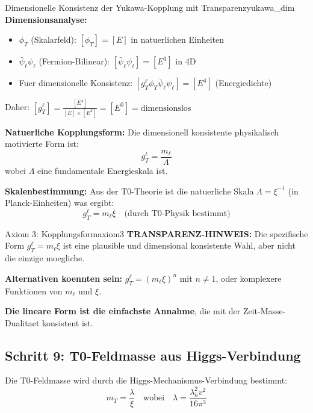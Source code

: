 \documentclass[12pt,a4paper]{article}
\begin{document}
	\begin{important}{Dimensionelle Konsistenz der Yukawa-Kopplung mit Transparenz}{yukawa_dim}
		\textbf{Dimensionsanalyse:}
		\begin{itemize}
			\item $\phi_T$ (Skalarfeld): $[\phi_T] = [E]$ in natuerlichen Einheiten
			\item $\bar{\psi}_\ell \psi_\ell$ (Fermion-Bilinear): $[\bar{\psi}_\ell \psi_\ell] = [E^3]$ in 4D
			\item Fuer dimensionelle Konsistenz: $[g_T^\ell \phi_T \bar{\psi}_\ell \psi_\ell] = [E^4]$ (Energiedichte)
		\end{itemize}
		
		Daher: $[g_T^\ell] = \frac{[E^4]}{[E] \times [E^3]} = [E^0] = \text{dimensionslos}$
		
		\textbf{Natuerliche Kopplungsform:}
		Die dimensionell konsistente physikalisch motivierte Form ist:
		\begin{equation}
			g_T^\ell = \frac{m_\ell}{\Lambda}
		\end{equation}
		wobei $\Lambda$ eine fundamentale Energieskala ist.
		
		\textbf{Skalenbestimmung:} Aus der T0-Theorie ist die natuerliche Skala $\Lambda = \xi^{-1}$ (in Planck-Einheiten) was ergibt:
		\begin{equation}
			\boxed{g_T^\ell = m_\ell \xi} \quad \text{(durch T0-Physik bestimmt)}
		\end{equation}
		
		\begin{warning}{Axiom 3: Kopplungsform}{axiom3}
			\textbf{TRANSPARENZ-HINWEIS:} Die spezifische Form $g_T^\ell = m_\ell \xi$ ist eine plausible und dimensional konsistente Wahl, aber nicht die einzige moegliche.
			
			\textbf{Alternativen koennten sein:} $g_T^\ell = (m_\ell \xi)^n$ mit $n \neq 1$, oder komplexere Funktionen von $m_\ell$ und $\xi$.
			
			\textbf{Die lineare Form ist die einfachste Annahme}, die mit der Zeit-Masse-Dualitaet konsistent ist.
		\end{warning}
	\end{important}
	
	\subsection{Schritt 9: T0-Feldmasse aus Higgs-Verbindung}
	
	Die T0-Feldmasse wird durch die Higgs-Mechanismus-Verbindung bestimmt:
	\begin{equation}
		m_T = \frac{\lambda}{\xi} \quad \text{wobei} \quad \lambda = \frac{\lambda_h^2 v^2}{16\pi^3}
		\label{eq:mT_definition}
	\end{equation}
	
\end{document}
